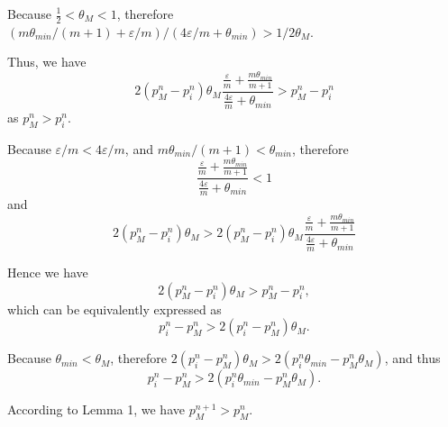 \documentclass[10pt,journal,cspaper,compsoc,onecolumn]{IEEEtran}
\begin{document}
\begin{spacing}{1.3}
\begin{IEEEproof}
Because $\frac{1}{2} < \theta_M < 1$, therefore
$(m\theta_{min}/(m + 1) + \varepsilon/m)/(4\varepsilon/m + \theta_{min}) > 1/2\theta_M$.

Thus, we have
$$2(p_M^n -p_i^n)\theta_M\displaystyle\frac{\displaystyle\frac{\varepsilon}{m} +\displaystyle\frac{m\theta_{min}}{m + 1}}{\displaystyle\frac{4\varepsilon}{m} + \theta_{min}} > p_M^n -p_i^n$$
as $p_M^n > p_i^n$.

Because $\varepsilon/m < 4\varepsilon/m$, and $m\theta_{min}/(m + 1) < \theta_{min}$, therefore
$$ \displaystyle\frac{\displaystyle\frac{\varepsilon}{m} +\displaystyle\frac{m\theta_{min}}{m + 1}}{\displaystyle\frac{4\varepsilon}{m} + \theta_{min}} < 1$$
and
$$ 2(p_M^n -p_i^n)\theta_M > 2(p_M^n -p_i^n)\theta_M\displaystyle\frac{\displaystyle\frac{\varepsilon}{m} +\displaystyle\frac{m\theta_{min}}{m + 1}}{\displaystyle\frac{4\varepsilon}{m} + \theta_{min}}$$

Hence we have
$$2(p_M^n -p_i^n)\theta_M > p_M^n -p_i^n,$$
which can be equivalently expressed as
$$p_i^n -p_M^n > 2(p_i^n - p_M^n)\theta_M.$$

Because $\theta_{min} < \theta_M$, therefore
$2(p_i^n - p_M^n)\theta_M > 2(p_i^n\theta_{min} - p_M^n\theta_M)$, and thus
$$p_i^n -p_M^n > 2(p_i^n\theta_{min} - p_M^n\theta_M).$$

According to Lemma 1, we have $p_M^{n + 1} > p_M^{n}$.
\end{IEEEproof}

\end{spacing}
\end{document}
